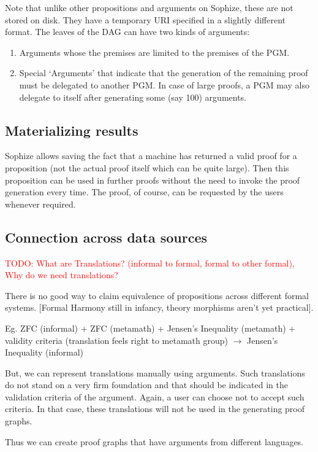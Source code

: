 \documentclass[a4paper]{article}
\newcommand\todo[1]{\textcolor{red}{TODO: #1}}
\begin{document}
Note that unlike other propositions and arguments on Sophize, these are not stored on disk. They have a temporary URI specified in a slightly different format. The leaves of the DAG can have two kinds of arguments:

\begin{enumerate}
\item Arguments whose the premises are limited to the premises of the PGM.
\item Special `Arguments' that indicate that the generation of the remaining proof must be delegated to another PGM. In case of large proofs, a PGM may also delegate to itself after generating some (say 100) arguments.
\end{enumerate}
\subsection{Materializing results}

Sophize allows saving the fact that a machine has returned a valid proof for a proposition (not the actual proof itself which can be quite large). Then this proposition can be used in further proofs without the need to invoke the proof generation every time. The proof, of course, can be requested by the users whenever required.


\subsection{Connection across data sources}
\todo{What are Translations? (informal to formal, formal to other formal), Why do we need translations?}

There is no good way to claim equivalence of propositions across different formal systems. [Formal Harmony still in infancy, theory morphisms aren't yet practical].


Eg. ZFC (informal) + ZFC (metamath) + Jensen's Inequality (metamath) + validity criteria (translation feels right to metamath group) $\rightarrow$ 
Jensen's Inequality (informal)

But, we can represent translations manually using arguments. Such translations do not stand on a very firm foundation and that should be indicated in the validation criteria of the argument. Again, a user can choose not to accept such criteria. In that case, these translations will not be used in the generating proof graphs.


Thus we can create proof graphs that have arguments from different languages.
\end{document}
